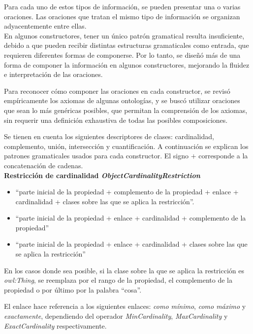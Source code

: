 Para cada uno de estos tipos de información, se pueden presentar una o varias oraciones. Las oraciones que tratan el mismo tipo de información se organizan adyacentemente entre ellas.
\\

En algunos constructores, tener un único patrón gramatical resulta insuficiente, debido a que pueden recibir distintas estructuras gramaticales como entrada, que requieren diferentes formas de componerse. Por lo tanto, se diseñó más de una forma de componer la información en algunos constructores, mejorando la fluidez e interpretación de las oraciones. 

Para reconocer cómo componer las oraciones en cada constructor, se revisó empíricamente los axiomas de algunas ontologías, y se buscó utilizar oraciones que sean lo más genéricas posibles, que permitan la comprensión de los axiomas, sin requerir una definición exhaustiva de todas las posibles composiciones. 

Se tienen en cuenta los siguientes descriptores de clases: cardinalidad, complemento, unión, intersección y cuantificación. A continuación se explican los patrones gramaticales usados para cada constructor. El signo $+$ corresponde a la concatenación de cadenas.
\\

{\bf Restricción de cardinalidad \emph{ObjectCardinalityRestriction}}
\begin{itemize}
    \item ``parte inicial de la propiedad + complemento de la propiedad + enlace + cardinalidad + clases sobre las que se aplica la restricción''.

    \item ``parte inicial de la propiedad + enlace + cardinalidad + complemento de la propiedad''

    \item ``parte inicial de la propiedad + enlace + cardinalidad + clases sobre las que se aplica la restricción''
\end{itemize}

En los casos donde sea posible, si la clase sobre la que se aplica la restricción es \emph{owl:Thing}, se reemplaza por el rango de la propiedad, el complemento de la propiedad o por último por la palabra ``cosa''.

El enlace hace referencia a los siguientes enlaces: \emph{como mínimo}, \emph{como máximo} y \emph{exactamente}, dependiendo del operador \emph{MinCardinality}, \emph{MaxCardinality} y \emph{ExactCardinality} respectivamente.

